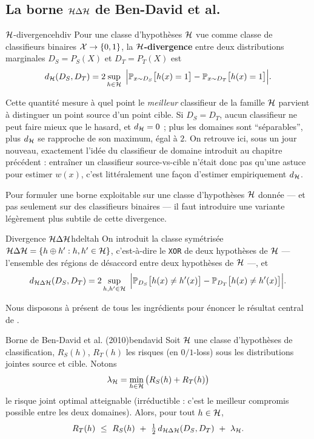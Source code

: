 \documentclass[11pt]{article}
\begin{document}
\subsection{La borne $\mathcal{H}\Delta\mathcal{H}$ de Ben-David et al.}

\begin{definition}{$\mathcal{H}$-divergence}{hdiv}
Pour une classe d'hypothèses $\mathcal{H}$ vue comme classe de classifieurs binaires $\mathcal{X}\to\{0,1\}$, la
\textbf{$\mathcal{H}$-divergence} entre deux distributions marginales $D_S=P_S(X)$ et $D_T=P_T(X)$ est
\[
d_{\Hcal}(D_S,D_T) = 2\sup_{h\in\Hcal}\ \Big|\P_{x\sim D_S}\big[h(x)=1\big] - \P_{x\sim D_T}\big[h(x)=1\big]\Big|.
\]
\end{definition}

Cette quantité mesure à quel point le \emph{meilleur} classifieur de la famille $\mathcal{H}$ parvient à
distinguer un point source d'un point cible. Si $D_S=D_T$, aucun classifieur ne peut faire mieux que le
hasard, et $d_{\mathcal{H}}=0$ ; plus les domaines sont \enquote{séparables}, plus $d_{\mathcal{H}}$ se rapproche de son
maximum, égal à $2$. On retrouve ici, sous un jour nouveau, exactement l'idée du classifieur de domaine
introduit au chapitre précédent : entraîner un classifieur source-vs-cible n'était donc pas qu'une astuce
pour estimer $w(x)$, c'est littéralement une façon d'estimer empiriquement $d_{\mathcal{H}}$.

Pour formuler une borne exploitable sur une classe d'hypothèses $\mathcal{H}$ donnée --- et pas seulement sur
des classifieurs binaires --- il faut introduire une variante légèrement plus subtile de cette
divergence.

\begin{definition}{Divergence $\mathcal{H}\Delta\mathcal{H}$}{hdeltah}
On introduit la classe symétrisée $\mathcal{H}\Delta\mathcal{H} = \{h\oplus h' : h,h'\in\mathcal{H}\}$, c'est-à-dire le
\texttt{XOR} de deux hypothèses de $\mathcal{H}$ --- l'ensemble des régions de désaccord entre deux hypothèses
de $\mathcal{H}$ ---, et
\[
\dHDelta(D_S,D_T) = 2\sup_{h,h'\in\Hcal}\ \Big|\P_{D_S}\big[h(x)\neq h'(x)\big] - \P_{D_T}\big[h(x)\neq
h'(x)\big]\Big|.
\]
\end{definition}

Nous disposons à présent de tous les ingrédients pour énoncer le résultat central de \citet{ben2010theory}.

\begin{theorem}{Borne de Ben-David et al. (2010)}{bendavid}
Soit $\mathcal{H}$ une classe d'hypothèses de classification, $R_S(h)$, $R_T(h)$ les risques (en $0/1$-loss)
sous les distributions jointes source et cible. Notons
\[
\lambda_{\mathcal{H}} = \min_{h\in\mathcal{H}}\big(R_S(h)+R_T(h)\big)
\]
le risque joint optimal atteignable (irréductible : c'est le meilleur compromis possible entre les deux
domaines). Alors, pour tout $h\in\mathcal{H}$,
\[
R_T(h) \ \le\ R_S(h) \ + \ \tfrac12\, d_{\mathcal{H}\Delta\mathcal{H}}(D_S,D_T) \ + \ \lambda_{\mathcal{H}}.
\]
\end{theorem}
\end{document}
